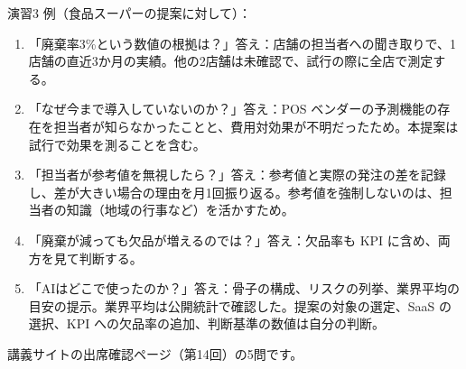 \begin{answer}{演習3}
例（食品スーパーの提案に対して）：
\begin{enumerate}[label=\arabic*.,leftmargin=2em]
  \item 「廃棄率3\%という数値の根拠は？」答え：店舗の担当者への聞き取りで、1店舗の直近3か月の実績。他の2店舗は未確認で、試行の際に全店で測定する。
  \item 「なぜ今まで導入していないのか？」答え：POS ベンダーの予測機能の存在を担当者が知らなかったことと、費用対効果が不明だったため。本提案は試行で効果を測ることを含む。
  \item 「担当者が参考値を無視したら？」答え：参考値と実際の発注の差を記録し、差が大きい場合の理由を月1回振り返る。参考値を強制しないのは、担当者の知識（地域の行事など）を活かすため。
  \item 「廃棄が減っても欠品が増えるのでは？」答え：欠品率も KPI に含め、両方を見て判断する。
  \item 「AIはどこで使ったのか？」答え：骨子の構成、リスクの列挙、業界平均の目安の提示。業界平均は公開統計で確認した。提案の対象の選定、SaaS の選択、KPI への欠品率の追加、判断基準の数値は自分の判断。
\end{enumerate}
\end{answer}

講義サイトの出席確認ページ（第14回）の5問です。

